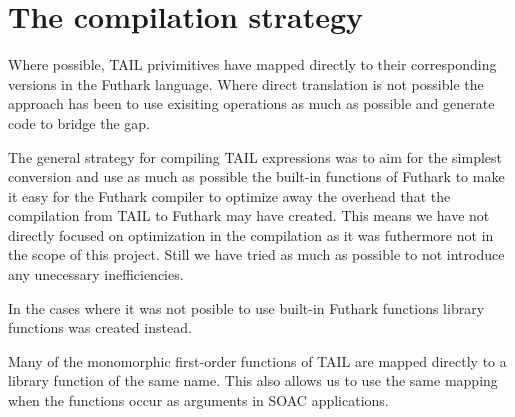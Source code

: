\documentclass[11pt]{article}
\begin{document}


\section{The compilation strategy}
\label{sec:strategy}
Where possible, TAIL privimitives have mapped directly to their corresponding versions in the Futhark language.
Where direct translation is not possible the approach has been to use exisiting operations as much
as possible and generate code to bridge the gap.



The general strategy for compiling TAIL expressions was to aim for the simplest conversion and use as much as possible 
the built-in functions of Futhark to make it easy for the Futhark compiler to optimize away the overhead that the compilation
from TAIL to Futhark may have created.
This means we have not directly focused on optimization in the compilation as it was futhermore not in the scope of this project.
Still we have tried as much as possible to not introduce any unecessary inefficiencies.

In the cases where it was not posible to use built-in Futhark functions library functions was created instead. 

Many of the monomorphic first-order functions of TAIL are mapped directly to a library function of the same name. This also allows us to use the same mapping when the functions occur as arguments in SOAC applications.

\end{document}
